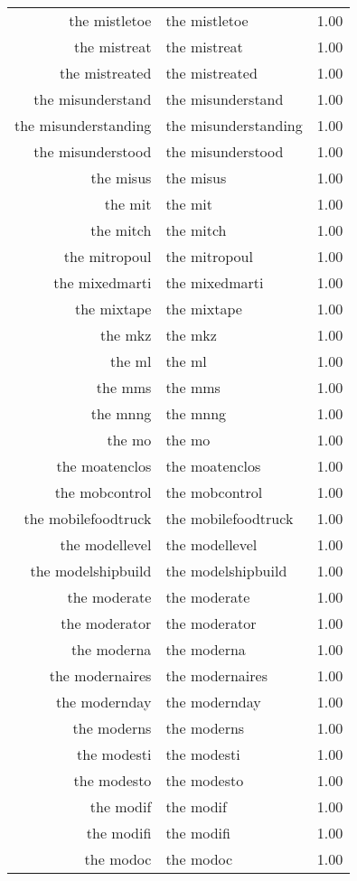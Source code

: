 \begin{table}[ht]
\begin{tabular}{rlr}
  the mistletoe & the mistletoe & 1.00 \\ 
  the mistreat & the mistreat & 1.00 \\ 
  the mistreated & the mistreated & 1.00 \\ 
  the misunderstand & the misunderstand & 1.00 \\ 
  the misunderstanding & the misunderstanding & 1.00 \\ 
  the misunderstood & the misunderstood & 1.00 \\ 
  the misus & the misus & 1.00 \\ 
  the mit & the mit & 1.00 \\ 
  the mitch & the mitch & 1.00 \\ 
  the mitropoul & the mitropoul & 1.00 \\ 
  the mixedmarti & the mixedmarti & 1.00 \\ 
  the mixtape & the mixtape & 1.00 \\ 
  the mkz & the mkz & 1.00 \\ 
  the ml & the ml & 1.00 \\ 
  the mms & the mms & 1.00 \\ 
  the mnng & the mnng & 1.00 \\ 
  the mo & the mo & 1.00 \\ 
  the moatenclos & the moatenclos & 1.00 \\ 
  the mobcontrol & the mobcontrol & 1.00 \\ 
  the mobilefoodtruck & the mobilefoodtruck & 1.00 \\ 
  the modellevel & the modellevel & 1.00 \\ 
  the modelshipbuild & the modelshipbuild & 1.00 \\ 
  the moderate & the moderate & 1.00 \\ 
  the moderator & the moderator & 1.00 \\ 
  the moderna & the moderna & 1.00 \\ 
  the modernaires & the modernaires & 1.00 \\ 
  the modernday & the modernday & 1.00 \\ 
  the moderns & the moderns & 1.00 \\ 
  the modesti & the modesti & 1.00 \\ 
  the modesto & the modesto & 1.00 \\ 
  the modif & the modif & 1.00 \\ 
  the modifi & the modifi & 1.00 \\ 
  the modoc & the modoc & 1.00 \\ 

\end{tabular}
\end{table}
